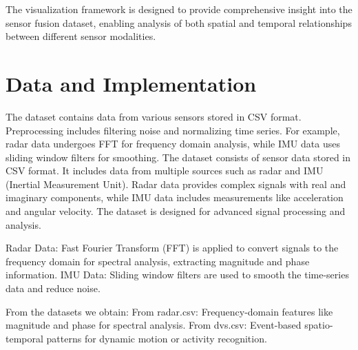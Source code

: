 \documentclass[12pt,a4paper]{article}
\begin{document}
The visualization framework is designed to provide comprehensive insight into the sensor fusion dataset, enabling analysis of both spatial and temporal relationships between different sensor modalities.
\section{Data and Implementation}

The dataset contains data from various sensors stored in CSV format. Preprocessing includes filtering noise and normalizing time series. For example, radar data undergoes FFT for frequency domain analysis, while IMU data uses sliding window filters for smoothing.
The dataset consists of sensor data stored in CSV format. It includes data from multiple sources such as radar and IMU (Inertial Measurement Unit).
Radar data provides complex signals with real and imaginary components, while IMU data includes measurements like acceleration and angular velocity. The dataset is designed for advanced signal processing and analysis.

Radar Data: Fast Fourier Transform (FFT) is applied to convert signals to the frequency domain for spectral analysis, extracting magnitude and phase information.
IMU Data: Sliding window filters are used to smooth the time-series data and reduce noise.

From the datasets we obtain:
From radar.csv: Frequency-domain features like magnitude and phase for spectral analysis.
From dvs.csv: Event-based spatio-temporal patterns for dynamic motion or activity recognition.
\end{document}
